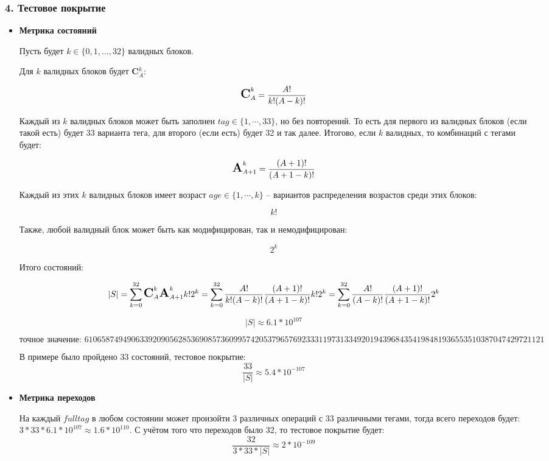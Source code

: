 
\subsubsection*{4. Тестовое покрытие}

\begin{itemize}[itemindent=0pt,leftmargin=0em,topsep=0pt,itemsep=-1ex,partopsep=1ex,parsep=1ex]
	\item \textbf{Метрика состояний}

	Пусть будет $k \in \{0, 1, \dots, 32\}$ валидных блоков.

	Для $k$ валидных блоков будет \textbf{C}$^k_A$:

	$$\text{\Large \textbf{C}}^k_A  = \frac{A!}{k!(A-k)!}$$

	Каждый из $k$ валидных блоков может быть заполнен $tag \in \{1,\cdots,33\}$, но без повторений. То есть для первого из валидных блоков (если такой есть) будет 33 варианта тега, для второго (если есть) будет 32 и так далее. Итогово, если $k$ валидных, то комбинаций с тегами будет:

	$$\text{\Large \textbf{A}}^k_{A+1} = \frac{(A+1)!}{(A+1-k)!}$$

	Каждый из этих $k$ валидных блоков имеет возраст $age \in \{1,\cdots,k\}$ -- вариантов распределения возрастов среди этих блоков:

	$$k!$$

	Также, любой валидный блок может быть как модифицирован, так и немодифицирован:

	$$2^k$$

	Итого состояний:

	$$|S| = \sum \limits^{32}_{k = 0} \text{\Large \textbf{C}}^k_A \text{\Large \textbf{A}}^k_{A+1} k! 2^k = \sum \limits^{32}_{k = 0} \frac{A!}{k!(A-k)!} \frac{(A+1)!}{(A+1-k)!} k! 2^k = \sum \limits^{32}_{k = 0} \frac{A!}{(A-k)!} \frac{(A+1)!}{(A+1-k)!} 2^k$$

	$$|S| \approx 6.1 * 10^{107}$$

	{\tiny \[\text{точное значение: }610658749490633920905628536908573609957420537965769233311973133492019439684354198481936553510387047429721121\]}

	В примере было пройдено 33 состояний, тестовое покрытие:
	$$\frac{33}{|S|}\approx 5.4 * 10^{-107}$$

	\item \textbf{Метрика переходов}

	На каждый $fulltag$ в любом состоянии может произойти 3 различных операций с 33 различными тегами, тогда всего переходов будет: $3 * 33 * 6.1 * 10^{107} \approx 1.6 * 10^{110}$. С учётом того что переходов было 32, то тестовое покрытие будет:
	$$\frac{32}{3 * 33 * |S|}\approx 2 * 10^{-109}$$


\end{itemize}